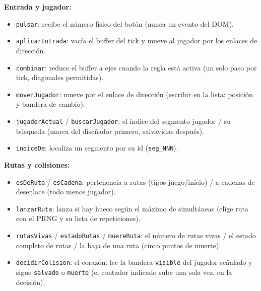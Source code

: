 \documentclass[../main.tex]{subfiles}
\begin{document}
\textbf{Entrada y jugador:}
\begin{itemize}
	\item \texttt{pulsar}: recibe el número físico del botón (nunca un
	evento del DOM).
	\item \texttt{aplicarEntrada}: vacía el buffer del tick y mueve al
	jugador por los enlaces de dirección.
	\item \texttt{combinar}: reduce el buffer a ejes cuando la regla
	está activa (un solo paso por tick, diagonales permitidas).
	\item \texttt{moverJugador}: mueve por el enlace de dirección
	(escribir en la lista: posición y bandera de cambio).
	\item \texttt{jugadorActual} / \texttt{buscarJugador}: el índice del
	segmento jugador / su búsqueda (marca del diseñador primero,
	salvavidas después).
	\item \texttt{indiceDe}: localiza un segmento por su id
	(\texttt{seg\_NNN}).
\end{itemize}

\textbf{Rutas y colisiones:}
\begin{itemize}
	\item \texttt{esDeRuta} / \texttt{esCadena}: pertenencia a rutas
	(tipos juego/inicio) / a cadenas de desenlace (todo menos jugador).
	\item \texttt{lanzarRuta}: lanza si hay hueco según el máximo de
	simultáneas (elige ruta con el PRNG y su lista de repeticiones).
	\item \texttt{rutasVivas} / \texttt{estadoRutas} / \texttt{muereRuta}:
	el número de rutas vivas / el estado completo de rutas / la baja de
	una ruta (cinco puntos de muerte).
	\item \texttt{decidirColision}: el corazón: lee la bandera
	\texttt{visible} del jugador señalado y sigue \texttt{salvado} o
	\texttt{muerte} (el contador indicado sube una sola vez, en la
	decisión).
\end{itemize}
\end{document}
